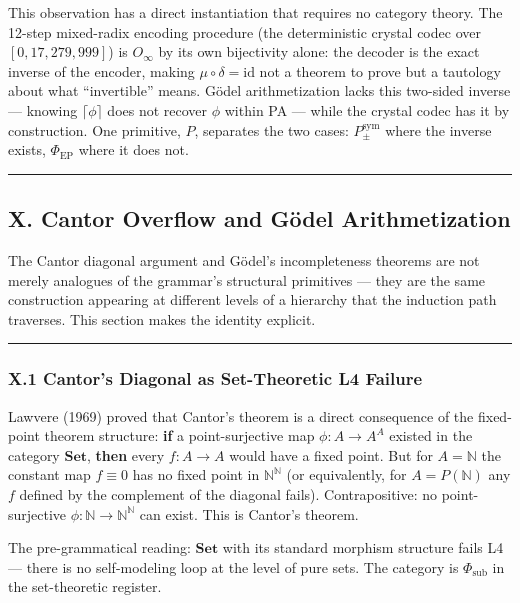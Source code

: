 \documentclass[12pt,a4paper]{article}
\begin{document}
This observation has a direct instantiation that requires no category theory. The 12-step mixed-radix encoding procedure (the deterministic crystal codec over $[0, 17{,}279{,}999]$) is $O_\infty$ by its own bijectivity alone: the decoder is the exact inverse of the encoder, making $\mu \circ \delta = \text{id}$ not a theorem to prove but a tautology about what ``invertible'' means. G\"odel arithmetization lacks this two-sided inverse --- knowing $\lceil\phi\rceil$ does not recover $\phi$ within PA --- while the crystal codec has it by construction. One primitive, $P$, separates the two cases: $P_{\pm}^{\text{sym}}$ where the inverse exists, $\Phi_\text{EP}$ where it does not.

\begin{center}
\rule{0.5\textwidth}{0.4pt}
\end{center}

\subsection{X. Cantor Overflow and G\"odel Arithmetization}

The Cantor diagonal argument and G\"odel's incompleteness theorems are not merely analogues of the grammar's structural primitives --- they are the same construction appearing at different levels of a hierarchy that the induction path traverses. This section makes the identity explicit.

\begin{center}
\rule{0.5\textwidth}{0.4pt}
\end{center}

\subsubsection{X.1 Cantor's Diagonal as Set-Theoretic L4 Failure}

Lawvere (1969) proved that Cantor's theorem is a direct consequence of the fixed-point theorem structure: \textbf{if} a point-surjective map $\phi: A \to A^A$ existed in the category $\mathbf{Set}$, \textbf{then} every $f: A \to A$ would have a fixed point. But for $A = \mathbb{N}$ the constant map $f \equiv 0$ has no fixed point in $\mathbb{N}^{\mathbb{N}}$ (or equivalently, for $A = P(\mathbb{N})$ any $f$ defined by the complement of the diagonal fails). Contrapositive: no point-surjective $\phi: \mathbb{N} \to \mathbb{N}^{\mathbb{N}}$ can exist. This is Cantor's theorem.

The pre-grammatical reading: $\mathbf{Set}$ with its standard morphism structure fails L4 --- there is no self-modeling loop at the level of pure sets. The category is $\Phi_\text{sub}$ in the set-theoretic register.
\end{document}
